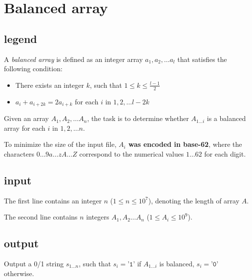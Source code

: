 \documentclass[UTF8]{ctexart}
\title{}
\author{周翟恩和 PB22000008}
\date{\today}
\begin{document}
\maketitle
\section{Balanced array}

\subsection{legend}
A \textit{balanced array} is defined as an integer array $ a_1,a_2,\ldots a_l $ that satisfies the following condition:
\begin{itemize}
        \item There exists an integer $k$, such that $ 1\le k\le \frac {l-1} 2$
        \item $ a_i+a_{i+2k}=2a_{i+k} $ for each $ i $ in $ 1,2,\ldots l-2k $ 
\end{itemize}

Given an array $ A_1,A_2,\ldots A_n $, the task is to determine whether $ A_{1\ldots i} $ is a balanced array for each $ i $ in $ 1,2,\ldots n $.

To minimize the size of the input file,\textbf{ \( A_i \) was encoded in base-62}, where the characters \( 0\ldots 9 \textit{a}\ldots \textit{z} \textit{A}\ldots \textit{Z} \) correspond to the numerical values \( 1\ldots 62 \) for each digit.

\subsection{input}

The first line contains an integer $ n $ ($ 1\le n\le 10^7 $), denoting the length of array $ A $.

The second line contains $ n $ integers $ A_1,A_{2}\ldots A_{n} $ ($ 1\le A_i\le 10^9 $).

\subsection{output}

Output a 0/1 string $ s_{1\ldots n} $, such that $ s_i=\texttt{'1'} $ if $ A_{1\ldots i} $ is balanced, $ s_i=\texttt{'0'} $ otherwise.
\end{document}
